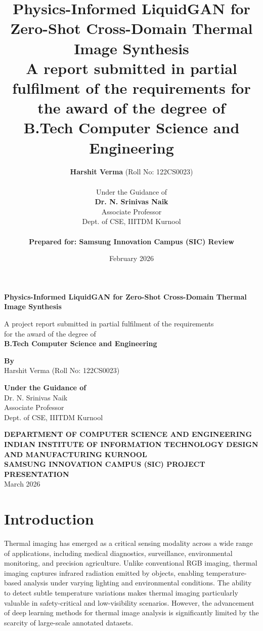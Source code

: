 \documentclass[12pt,a4paper]{report}
\title{\textbf{Physics-Informed LiquidGAN for Zero-Shot Cross-Domain Thermal Image Synthesis} \\ \vspace{0.5cm} \large A report submitted in partial fulfilment of the requirements for the award of the degree of \\ \textbf{B.Tech Computer Science and Engineering}}
\author{\textbf{Harshit Verma} (Roll No: 122CS0023) \\ \\ Under the Guidance of \\ \textbf{Dr. N. Srinivas Naik} \\ Associate Professor \\ Dept. of CSE, IIITDM Kurnool \\ \\ \textbf{Prepared for: Samsung Innovation Campus (SIC) Review}}
\date{February 2026}
\begin{document}
\begin{titlepage}
    \centering
    \vspace*{1cm}
    
    \Huge
    \textbf{Physics-Informed LiquidGAN for Zero-Shot Cross-Domain Thermal Image Synthesis}
    
    \vspace{1.5cm}
    \large
    A project report submitted in partial fulfilment of the requirements \\
    for the award of the degree of \\
    \textbf{B.Tech Computer Science and Engineering}
    
    \vspace{1.5cm}
    \textbf{By} \\
    \vspace{0.5cm}
    Harshit Verma (Roll No: 122CS0023)
    
    \vspace{2cm}
    \textbf{Under the Guidance of} \\
    \vspace{0.5cm}
    Dr. N. Srinivas Naik \\
    Associate Professor \\
    Dept. of CSE, IIITDM Kurnool
    
    \vfill
    
    \large
    \textbf{DEPARTMENT OF COMPUTER SCIENCE AND ENGINEERING} \\
    \textbf{INDIAN INSTITUTE OF INFORMATION TECHNOLOGY DESIGN AND MANUFACTURING KURNOOL} \\
    \vspace{0.5cm}
    \textbf{SAMSUNG INNOVATION CAMPUS (SIC) PROJECT PRESENTATION} \\
    March 2026
\end{titlepage}

\tableofcontents

\chapter{Introduction}
Thermal imaging has emerged as a critical sensing modality across a wide range of applications, including medical diagnostics, surveillance, environmental monitoring, and precision agriculture. Unlike conventional RGB imaging, thermal imaging captures infrared radiation emitted by objects, enabling temperature-based analysis under varying lighting and environmental conditions. The ability to detect subtle temperature variations makes thermal imaging particularly valuable in safety-critical and low-visibility scenarios. However, the advancement of deep learning methods for thermal image analysis is significantly limited by the scarcity of large-scale annotated datasets.
\end{document}
